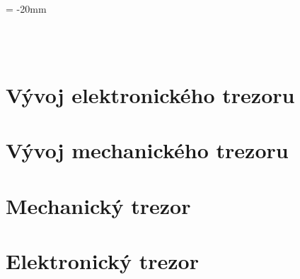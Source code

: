 \documentclass{template/DMP}
\begin{document}
\enlargethispage{40mm} %

\begin{center}
    \voffset = -20mm
    {\centering \LARGE {}} \\
    \vspace{40mm}
    {\centering \LARGE {}} \\

    \vfill

        {\Large \B{\@author}} \\

    \vspace{20mm}

    {\large \B{\@placefooter}}
\end{center}




\tableofcontents %

\setcounter{figure}{0}
\setcounter{table}{0}
\newpage



\chapter{Vývoj elektronického trezoru}
\label{E-vyvoj}






\chapter{Vývoj mechanického trezoru}
\label{M-vyvoj}





\chapter{Mechanický trezor} 
\label{M3}




%

\newpage
\chapter{Elektronický trezor}
\label{E4}
\end{document}
